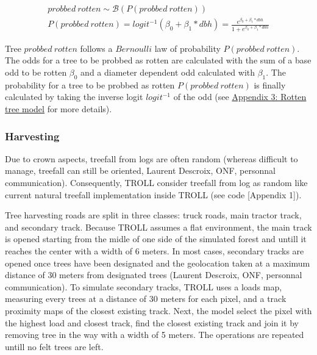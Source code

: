 \documentclass[12pt,]{article}
\theoremstyle{definition}
\theoremstyle{definition}
\theoremstyle{remark}
\begin{document}
\begin{equation}
  \begin{array}{c} 
    probbed~rotten \sim \mathcal{B}(P(probbed~rotten)) \\
    P(probbed~rotten) = logit^{-1}(\beta_0 + \beta_1*dbh) = \frac{e^{\beta_0 + \beta_1*dbh}}{1 + e^{\beta_0 + \beta_1*dbh}}
  \end{array}
  \label{eq:rotten}
\end{equation}

Tree \(probbed~rotten\) follows a \(Bernoulli\) law of probability
\(P(probbed~rotten)\). The odds for a tree to be probbed as rotten are
calculated with the sum of a base odd to be rotten \(\beta_0\) and a
diameter dependent odd calculated with \(\beta_1\). The probability for
a tree to be probbed as rotten \(P(probbed~rotten)\) is finally
calculated by taking the inverse logit \(logit^{-1}\) of the odd (see
\protect\hyperlink{appendix-3-rotten-tree-model}{Appendix 3: Rotten tree
model} for more details).

\subsubsection{Harvesting}\label{harvesting}

Due to crown aspects, treefall from logs are often random (whereas
difficult to manage, treefall can still be oriented, Laurent Descroix,
ONF, personnal communication). Consequently, TROLL consider treefall
from log as random like current natural treefall implementation inside
TROLL (see code {[}Appendix 1{]}).

Tree harvesting roads are split in three classes: truck roads, main
tractor track, and secondary track. Because TROLL assumes a flat
environment, the main track is opened starting from the midle of one
side of the simulated forest and untill it reaches the center with a
width of 6 meters. In most cases, secondary tracks are opened once trees
have been designated and the geolocation taken at a maximum distance of
30 meters from designated trees (Laurent Descroix, ONF, personnal
communication). To simulate secondary tracks, TROLL uses a loads map,
measuring every trees at a distance of 30 meters for each pixel, and a
track proximity maps of the closest existing track. Next, the model
select the pixel with the highest load and closest track, find the
closest existing track and join it by removing tree in the way with a
width of 5 meters. The operations are repeated untill no felt trees are
left.
\end{document}
